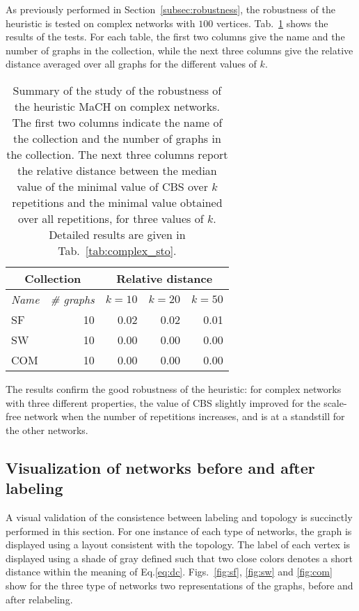 \documentclass{scrartcl}
\theoremstyle{plain}
\newcommand{\algo}{MaCH}
\newcommand{\cbs}{CBS}
\begin{document}
As previously performed in Section~\ref{subsec:robustness}, the robustness of 
the heuristic is tested on complex networks with $100$ vertices. 
Tab.~\ref{tab:complex_sto_sum} shows the results of the tests. For each table, 
the first two columns give the name and the number of graphs in the collection, 
while the next three columns give the relative distance averaged over all 
graphs 
for the different values of $k$.

\begin{table}[!ht]
	\centering
	\small
	\begin{tabular}{|lr|rrr|}
		\hline
		\multicolumn{2}{|c|}{\textbf{Collection}} & 
		\multicolumn{3}{c|}{\textbf{Relative distance}} \\
		\hline
		\multicolumn{1}{|c}{\emph{Name}} & 
		\multicolumn{1}{c|}{\emph{\# graphs}} & 
		\multicolumn{1}{c}{$k=10$} & 
		\multicolumn{1}{c}{$k=20$} & 
		\multicolumn{1}{c|}{$k=50$} \\ \hline

		\makeatletter{}SF & 10 & 0.02 & 0.02 & 0.01 \\ 
SW & 10 & 0.00 & 0.00 & 0.00 \\ 
COM & 10 & 0.00 & 0.00 & 0.00 \\ 
 
		\hline

\end{tabular}

\caption{\label{tab:complex_sto_sum}Summary of the study of the robustness of 
the heuristic \algo{} on complex networks.  The first two columns indicate the 
name of the collection and the number of graphs in the collection. The next 
three columns report the relative distance between the median value of the 
minimal value of \cbs{} over $k$ repetitions and the minimal value obtained over 
all repetitions, for three values of $k$. Detailed results are given in 
Tab.~\ref{tab:complex_sto}.}
\end{table}

The results confirm the good robustness of the heuristic: for complex networks 
with three different properties, the value of \cbs{} slightly improved for the 
scale-free network when the number of repetitions increases, and is at a 
standstill for the other networks.


\subsection{Visualization of networks before and after labeling}
A visual validation of the consistence between labeling and topology is 
succinctly performed in this section. For one instance of each type of networks, 
the graph is displayed using a layout consistent with the topology. The label of 
each vertex is displayed using a shade of gray defined such that two close 
colors denotes a short distance within the meaning of Eq.\ref{eq:dc}. 
Figs.~\ref{fig:sf}, \ref{fig:sw} and \ref{fig:com} show for the three type of 
networks two representations of the graphs, before and after relabeling. 
\end{document}
